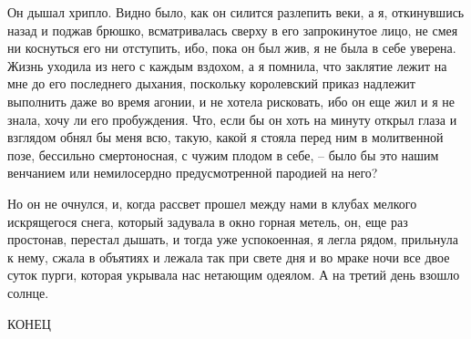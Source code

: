 Он дышал хрипло. Видно было, как он силится разлепить веки, а я, откинувшись
назад и поджав брюшко, всматривалась сверху в его запрокинутое лицо, не смея
ни  коснуться его  ни отступить,  ибо, пока  он был  жив, я  не была  в себе
уверена. Жизнь уходила  из него с каждым вздохом, а  я помнила, что заклятие
лежит  на  мне  до  его последнего  дыхания,  поскольку  королевский  приказ
надлежит выполнить даже  во время агонии, и не хотела  рисковать, ибо он еще
жил и я  не знала, хочу ли его  пробуждения. Что, если бы он  хоть на минуту
открыл глаза и взглядом обнял бы меня всю, такую, какой я стояла перед ним в
молитвенной позе, бессильно смертоносная, с чужим  плодом в себе, -- было бы
это нашим венчанием или немилосердно предусмотренной пародией на него?

Но  он не  очнулся, и,  когда  рассвет прошел  между нами  в клубах  мелкого
искрящегося  снега, который  задувала  в  окно горная  метель,  он, еще  раз
простонав,  перестал  дышать,  и  тогда  уже  успокоенная,  я  легла  рядом,
прильнула к  нему, сжала в объятиях  и лежала так  при свете дня и  во мраке
ночи  все двое  суток пурги,  которая укрывала  нас нетающим  одеялом. А  на
третий день взошло солнце.


КОНЕЦ
